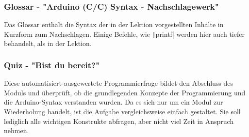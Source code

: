 \documentclass[a4paper]{article}
\def\CC{{C\nolinebreak[4]\hspace{-.05em}\raisebox{.4ex}{\tiny\bf ++}}}
\begin{document}
\begin{minipage}[b][\textheight-1.6cm][t]{0.55\textwidth}
    \subsubsection{Glossar - "Arduino (C/\CC) Syntax - Nachschlagewerk"}
    Das Glossar enthält die Syntax der in der Lektion vorgestellten Inhalte in Kurzform zum Nachschlagen. Einige Befehle, wie \texttt|printf| werden hier auch tiefer behandelt, als in der Lektion.

    \subsubsection{Quiz - "Bist du bereit?"}
    Diese automatisiert ausgewertete Programmierfrage bildet den Abschluss des Moduls und überprüft, ob die grundlegenden Konzepte der Programmierung und die Arduino-Syntax verstanden wurden. Da es sich nur um ein Modul zur Wiederholung handelt, ist die Aufgabe vergleichsweise einfach gestaltet. Sie soll lediglich alle wichtigen Konstrukte abfragen, aber nicht viel Zeit in Anspruch nehmen.


\end{minipage}
\end{document}
